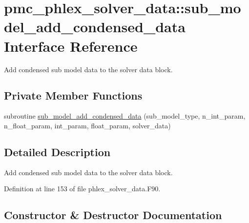 \hypertarget{interfacepmc__phlex__solver__data_1_1sub__model__add__condensed__data}{}\section{pmc\+\_\+phlex\+\_\+solver\+\_\+data\+:\+:sub\+\_\+model\+\_\+add\+\_\+condensed\+\_\+data Interface Reference}
\label{interfacepmc__phlex__solver__data_1_1sub__model__add__condensed__data}


Add condensed sub model data to the solver data block.  


\subsection*{Private Member Functions}
\begin{DoxyCompactItemize}
\item 
subroutine \mbox{\hyperlink{interfacepmc__phlex__solver__data_1_1sub__model__add__condensed__data_a6c9b2de3fe5f1b96db6b11b4cb4ae2ef}{sub\+\_\+model\+\_\+add\+\_\+condensed\+\_\+data}} (sub\+\_\+model\+\_\+type, n\+\_\+int\+\_\+param, n\+\_\+float\+\_\+param, int\+\_\+param, float\+\_\+param, solver\+\_\+data)
\end{DoxyCompactItemize}


\subsection{Detailed Description}
Add condensed sub model data to the solver data block. 

Definition at line 153 of file phlex\+\_\+solver\+\_\+data.\+F90.



\subsection{Constructor \& Destructor Documentation}
\mbox{\label{interfacepmc__phlex__solver__data_1_1sub__model__add__condensed__data_a6c9b2de3fe5f1b96db6b11b4cb4ae2ef}} 
